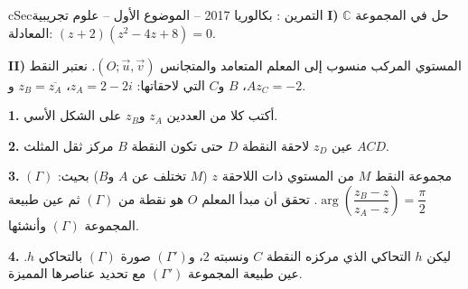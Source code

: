 \documentclass[12pt,a4paper]{article}
\newenvironment{BOX}[2]{\begin{otherlanguage}{english}\begin{arbox}{#1}{#2}}{\end{arbox}\end{otherlanguage}}
\newcounter{exo}
\newenvironment{tamrin}[1]{\stepcounter{exo}\begin{BOX}{cSec}{التمرين \theexo: #1}}{\end{BOX}}
\newcommand{\QQ}[1]{\par\smallskip\textbf{#1.} }
\begin{document}
\begin{tamrin}{بكالوريا 2017 -- الموضوع الأول -- علوم تجريبية}
\textbf{I)} حل في المجموعة $\mathbb{C}$ المعادلة: $(z+2)\left(z^2-4z+8\right)=0$.

\textbf{II)} المستوي المركب منسوب إلى المعلم المتعامد والمتجانس $(O;\vec u,\vec v)$.
نعتبر النقط $A$، $B$ و$C$ التي لاحقاتها: $z_A=2-2i$، $z_B=\overline{z_A}$ و$z_C=-2$.
\QQ{1} أكتب كلا من العددين $z_A$ و$z_B$ على الشكل الأسي.
\QQ{2} عين $z_D$ لاحقة النقطة $D$ حتى تكون النقطة $B$ مركز ثقل المثلث $ACD$.
\QQ{3} $(\Gamma)$ مجموعة النقط $M$ من المستوي ذات اللاحقة $z$ ($M$ تختلف عن $A$ و$B$) بحيث: $\arg\left(\dfrac{z_B-z}{z_A-z}\right)=\dfrac{\pi}{2}$.
تحقق أن مبدأ المعلم $O$ هو نقطة من $(\Gamma)$ ثم عين طبيعة المجموعة $(\Gamma)$ وأنشئها.
\QQ{4} ليكن $h$ التحاكي الذي مركزه النقطة $C$ ونسبته $2$، و$(\Gamma')$ صورة $(\Gamma)$ بالتحاكي $h$.
عين طبيعة المجموعة $(\Gamma')$ مع تحديد عناصرها المميزة.
\end{tamrin}
\end{document}
